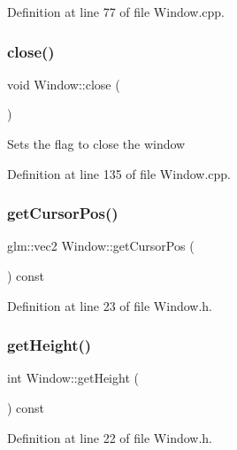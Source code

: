 Definition at line 77 of file Window.\+cpp.

\mbox{\label{class_window_a35055c04498121d39741bfcd5082705b}} 
\subsubsection{\texorpdfstring{close()}{close()}}
{\footnotesize\ttfamily void Window\+::close (\begin{DoxyParamCaption}{ }\end{DoxyParamCaption})}

Sets the flag to close the window 

Definition at line 135 of file Window.\+cpp.

\mbox{\label{class_window_ab276bf3630d294d6eee8c5992b93e721}} 
\subsubsection{\texorpdfstring{get\+Cursor\+Pos()}{getCursorPos()}}
{\footnotesize\ttfamily glm\+::vec2 Window\+::get\+Cursor\+Pos (\begin{DoxyParamCaption}{ }\end{DoxyParamCaption}) const\hspace{0.3cm}{\ttfamily [inline]}}



Definition at line 23 of file Window.\+h.

\mbox{\label{class_window_a60757b2b0dbcec9889e3a09f5655adbe}} 
\subsubsection{\texorpdfstring{get\+Height()}{getHeight()}}
{\footnotesize\ttfamily int Window\+::get\+Height (\begin{DoxyParamCaption}{ }\end{DoxyParamCaption}) const\hspace{0.3cm}{\ttfamily [inline]}}



Definition at line 22 of file Window.\+h.

